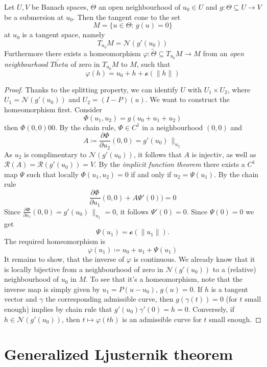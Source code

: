\begin{theorem}[Ljustemite(?), 1934]\label{theorem_1.29}
	Let $U,V$ be Banach spaces, $\Theta$ an open neighbourhood of $u_0\in U$ and $g:\Theta\subseteq U\to V$ be a submersion at $u_0$. Then the tangent cone to the set
	\[
		M=\{u\in\Theta:\,g(u)=0\}
	\]
	at $u_0$ is a tangent space, namely
	\[
		T_{u_0}M = \mathcal{N}(g'(u_0))
	\]
	Furthermore there exists a homeomorphism $\varphi:\tilde{\Theta}\subseteq T_{u_0}M\to M$ from an \emph{open neighbourhood} $\tilde{Theta}$ of zero in $T_{u_0}M$ to $M$, such that
	\[
		\varphi(h) = u_0+h + \mathcal{o}(\|h\|)
	\]
\end{theorem}
\begin{proof}
	Thanks to the splitting property, we can identify $U$ with $U_1\times U_2$, where $U_1=\mathcal{N}(g'(u_0))$ and $U_2 = (I-P)(u)$. We want to construct the homeomorphism first. Consider
	\[
		\Phi(u_1,u_2) = g(u_0+u_1+u_2)
	\]
	then $\Phi(0,0) 0 0$. By the chain rule, $\Phi\in C^1$ in a neighbourhood $(0,0)$ and 
	\[
		A \coloneqq \frac{\partial\Phi}{\partial u_2}(0,0) = g'(u_0)\,\parallel_{u_2}
	\]
	As $u_2$ is complimentary to $\mathcal{N}(g'(u_0))$, it follows that $A$ is injectiv, as well as $\mathcal{R}(A) = \mathcal{R}(g'(u_0)) = V$. By the \emph{implicit function theorem} there exists a $C^1$ map $\Psi$ such that locally $\Phi(u_1,u_2) = 0$ if and only if $u_2=\Psi(u_1)$. By the chain rule 
	\[
		\frac{\partial\Phi}{\partial u_1}(0,0) + A\Psi'(0)) = 0 
	\]
	Since $\frac{\partial\Phi}{\partial u_1}(0,0) = g'(u_0)\,\parallel_{u_1} = 0$, it follows $\Psi'(0) = 0$. Since $\Psi(0) = 0$ we get
	\[
		\Psi(u_1) = \mathcal{o}(\|u_1\|).
	\]
	The required homeomorphism is
	\[
		\varphi(u_1) \coloneqq u_0 + u_1 + \Psi(u_1)
	\]
	It remains to show, that the inverse of $\varphi$ is continuous. We already know that it is locally bijective from a neighbourhood of zero in $\mathcal{N}(g'(u_0))$ to a (relative) neighbourhood of $u_0$ in $M$. To see that it's a homeomorphism, note that the inverse map is simply given by $u_1 = P(u-u_0),\,g(u) = 0$. \newline\noindent
	If $h$ is a tangent vector and $\gamma$ the corresponding admissible curve, then $g(\gamma(t))=0$ (for $t$ small enough) implies by chain rule that $g'(u_0)\gamma'(0)=h=0$. \newline\noindent
	Conversely, if $h\in\mathcal{N}(g'(u_0))$, then $t\mapsto \varphi(th)$ is an admissible curve for $t$ small enough.   
\end{proof}

\section*{Generalized Ljusternik theorem}

